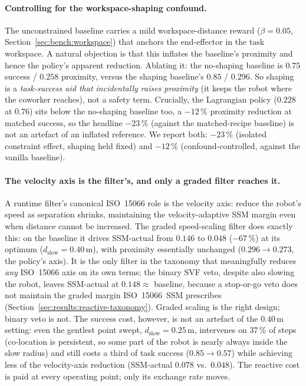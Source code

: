 \documentclass[11pt,a4paper]{report}
\newcommand{\ssm}{SSM}
\newcommand{\iso}{ISO~15066}
\begin{document}
\paragraph{Controlling for the workspace-shaping confound.}
The unconstrained baseline carries a mild workspace-distance reward
($\beta = 0.05$, Section~\ref{sec:bench:workspace}) that anchors the
end-effector in the task workspace. A natural objection is that this
inflates the baseline's proximity and hence the policy's apparent
reduction. Ablating it: the no-shaping baseline is $0.75$ success /
$0.258$ proximity, versus the shaping baseline's $0.85$ / $0.296$. So
shaping is a \emph{task-success aid that incidentally raises
proximity} (it keeps the robot where the coworker reaches), not a
safety term. Crucially, the Lagrangian policy ($0.228$ at $0.76$) sits
below the no-shaping baseline too, a $-12\,\%$ proximity reduction at
matched success, so the headline $-23\,\%$ (against the matched-recipe
baseline) is not an artefact of an inflated reference. We report both:
$-23\,\%$ (isolated constraint effect, shaping held fixed) and
$-12\,\%$ (confound-controlled, against the vanilla baseline).

\paragraph{The velocity axis is the filter's, and only a graded filter
reaches it.}
A runtime filter's canonical \iso{} role is the velocity axis: reduce
the robot's speed as separation shrinks, maintaining the
velocity-adaptive \ssm{} margin even when distance cannot be increased.
The graded speed-scaling filter does exactly this: on the baseline it
drives \ssm{}-actual from $0.146$ to $0.048$ ($-67\,\%$) at its optimum
($d_{\mathrm{slow}} = 0.40$\,m), with proximity essentially unchanged
($0.296 \rightarrow 0.273$, the policy's axis). It is the only filter
in the taxonomy that meaningfully reduces \emph{any} \iso{} axis on its
own terms; the binary SVF veto, despite also slowing the robot, leaves
\ssm{}-actual at $0.148 \approx$ baseline, because a stop-or-go veto
does not maintain the graded margin \iso{}~\ssm{} prescribes
(Section~\ref{sec:results:reactive-taxonomy}). Graded scaling is the
right design; binary veto is not. The success cost, however, is not an
artefact of the $0.40$\,m setting: even the gentlest point swept,
$d_{\mathrm{slow}} = 0.25$\,m, intervenes on $37\,\%$ of steps
(co-location is persistent, so some part of the robot is nearly always
inside the slow radius) and still costs a third of task success
($0.85 \rightarrow 0.57$) while achieving less of the velocity-axis
reduction (\ssm{}-actual $0.078$ vs.\ $0.048$). The reactive cost is
paid at every operating point; only its exchange rate moves.
\end{document}
